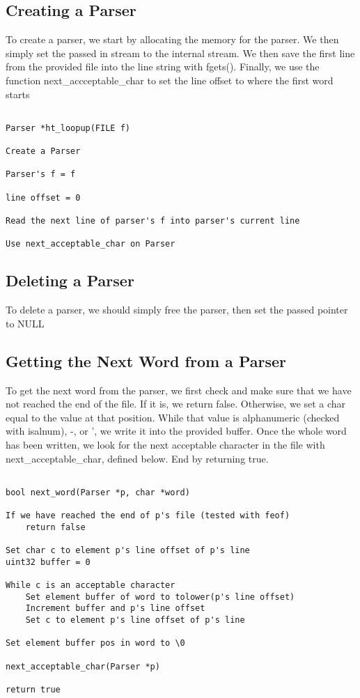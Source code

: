 \documentclass[11pt]{article}
\begin{document}
\subsection{Creating a Parser}

To create a parser, we start by allocating the memory for the parser. We then simply set the passed in stream to the internal stream. We then save the first line from the provided file into the line string with fgets(). Finally, we use the function next\_accceptable\_char to set the line offset to where the first word starts

\begin{verbatim}

Parser *ht_loopup(FILE f)

Create a Parser

Parser's f = f

line offset = 0

Read the next line of parser's f into parser's current line

Use next_acceptable_char on Parser

\end{verbatim}

\subsection{Deleting a Parser}

To delete a parser, we should simply free the parser, then set the passed pointer to NULL

\subsection{Getting the Next Word from a Parser}

To get the next word from the parser, we first check and make sure that we have not reached the end of the file. If it is, we return false. Otherwise, we set a char equal to the value at that position. While that value is alphanumeric (checked with isalnum), -, or ', we write it into the provided buffer. Once the whole word has been written, we look for the next acceptable character in the file with next\_acceptable\_char, defined below. End by returning true.

\begin{verbatim}

bool next_word(Parser *p, char *word)

If we have reached the end of p's file (tested with feof)
    return false

Set char c to element p's line offset of p's line
uint32 buffer = 0

While c is an acceptable character
    Set element buffer of word to tolower(p's line offset)
    Increment buffer and p's line offset
    Set c to element p's line offset of p's line

Set element buffer pos in word to \0

next_acceptable_char(Parser *p)

return true

\end{verbatim}
\end{document}
